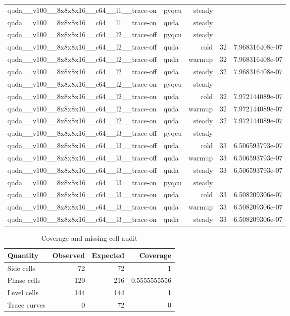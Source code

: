 \begin{table}[htbp]
\begin{tabular}{@{}llrrr@{}}
quda\_\_v100\_\_8x8x8x16\_\_c64\_\_l1\_\_trace-on & pyqcu & steady &  &  \\
quda\_\_v100\_\_8x8x8x16\_\_c64\_\_l1\_\_trace-on & quda & steady &  &  \\
quda\_\_v100\_\_8x8x8x16\_\_c64\_\_l2\_\_trace-off & pyqcu & steady &  &  \\
quda\_\_v100\_\_8x8x8x16\_\_c64\_\_l2\_\_trace-off & quda & cold & 32 & 7.968316408e-07 \\
quda\_\_v100\_\_8x8x8x16\_\_c64\_\_l2\_\_trace-off & quda & warmup & 32 & 7.968316408e-07 \\
quda\_\_v100\_\_8x8x8x16\_\_c64\_\_l2\_\_trace-off & quda & steady & 32 & 7.968316408e-07 \\
quda\_\_v100\_\_8x8x8x16\_\_c64\_\_l2\_\_trace-on & pyqcu & steady &  &  \\
quda\_\_v100\_\_8x8x8x16\_\_c64\_\_l2\_\_trace-on & quda & cold & 32 & 7.972144089e-07 \\
quda\_\_v100\_\_8x8x8x16\_\_c64\_\_l2\_\_trace-on & quda & warmup & 32 & 7.972144089e-07 \\
quda\_\_v100\_\_8x8x8x16\_\_c64\_\_l2\_\_trace-on & quda & steady & 32 & 7.972144089e-07 \\
quda\_\_v100\_\_8x8x8x16\_\_c64\_\_l3\_\_trace-off & pyqcu & steady &  &  \\
quda\_\_v100\_\_8x8x8x16\_\_c64\_\_l3\_\_trace-off & quda & cold & 33 & 6.506593793e-07 \\
quda\_\_v100\_\_8x8x8x16\_\_c64\_\_l3\_\_trace-off & quda & warmup & 33 & 6.506593793e-07 \\
quda\_\_v100\_\_8x8x8x16\_\_c64\_\_l3\_\_trace-off & quda & steady & 33 & 6.506593793e-07 \\
quda\_\_v100\_\_8x8x8x16\_\_c64\_\_l3\_\_trace-on & pyqcu & steady &  &  \\
quda\_\_v100\_\_8x8x8x16\_\_c64\_\_l3\_\_trace-on & quda & cold & 33 & 6.508209306e-07 \\
quda\_\_v100\_\_8x8x8x16\_\_c64\_\_l3\_\_trace-on & quda & warmup & 33 & 6.508209306e-07 \\
quda\_\_v100\_\_8x8x8x16\_\_c64\_\_l3\_\_trace-on & quda & steady & 33 & 6.508209306e-07 \\
\bottomrule
\end{tabular}
\end{table}

\begin{table}[htbp]
\centering
\caption{Coverage and missing-cell audit}
\small
\begin{tabular}{@{}lrrr@{}}
\toprule
Quantity & Observed & Expected & Coverage \\
\midrule
Side cells & 72 & 72 & 1 \\
Phase cells & 120 & 216 & 0.5555555556 \\
Level cells & 144 & 144 & 1 \\
Trace curves & 0 & 72 & 0 \\
\bottomrule
\end{tabular}
\end{table}
